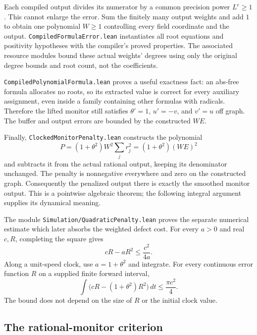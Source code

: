 \documentclass[11pt]{article}
\newcommand{\code}[1]{{\small\nolinkurl{#1}}}
\begin{document}
Each compiled output divides its numerator by a common precision power
$L^e\ge1$. This cannot enlarge the error. Sum the finitely many output
weights and add $1$ to obtain one polynomial $W\ge1$ controlling every
field coordinate and the output. \code{CompiledFormulaError.lean}
instantiates all root equations and positivity hypotheses with the
compiler's proved properties. The associated resource modules bound
these actual weights' degrees using only the original degree bounds and
root count, not the coefficients.

\code{CompiledPolynomialFormula.lean} proves a useful exactness fact:
an abs-free formula allocates no roots, so its extracted value is correct
for every auxiliary assignment, even inside a family containing other
formulas with radicals. Therefore the lifted monitor still satisfies
$\theta'=1$, $u'=-v$, and $v'=u$ off graph. The buffer and output errors
are bounded by the constructed $WE$.

Finally, \code{ClockedMonitorPenalty.lean} constructs the polynomial
\[
 P=(1+\theta^2)W^2\sum_jr_j^2=(1+\theta^2)(WE)^2
\]
and subtracts it from the actual rational output, keeping its denominator
unchanged. The penalty is nonnegative everywhere and zero on the
constructed graph. Consequently the penalized output there is exactly
the smoothed monitor output. This is a pointwise algebraic theorem;
the following integral argument supplies its dynamical meaning.

The module \code{Simulation/QuadraticPenalty.lean} proves the separate
numerical estimate which later absorbs the weighted defect cost. For
every $a>0$ and real $c,R$, completing the square gives
\[
 cR-aR^2\le\frac{c^2}{4a}.
\]
Along a unit-speed clock, use $a=1+\theta^2$ and integrate. For every
continuous error function $R$ on a supplied finite forward interval,
\[
 \int\bigl(cR-(1+\theta^2)R^2\bigr)\,dt
 \le\frac{\pi c^2}{4}.
\]
The bound does not depend on the size of $R$ or the initial clock value.

\subsection{The rational-monitor criterion}
\end{document}
